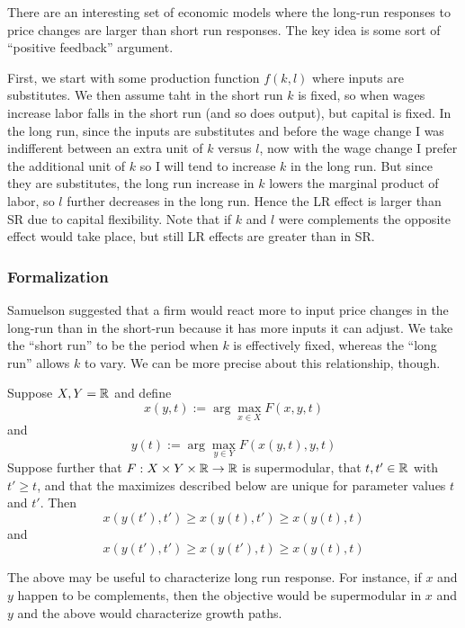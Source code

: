 There are an interesting set of economic models where the long-run
responses to price changes are larger than short run responses. The
key idea is some sort of ``positive feedback'' argument.

First, we start with some production function $f(k, l)$ where inputs
are substitutes. We then assume taht in the short run $k$ is fixed, so
when wages increase labor falls in the short run (and so does output),
but capital is fixed. In the long run, since the inputs are
substitutes and before the wage change I was indifferent between an
extra unit of $k$ versus $l$, now with the wage change I prefer the
additional unit of $k$ so I will tend to increase $k$ in the long
run. But since they are substitutes, the long run increase in $k$
lowers the marginal product of labor, so $l$ further decreases in the
long run. Hence the LR effect is larger than SR due to capital
flexibility. Note that if $k$ and $l$ were complements the opposite
effect would take place, but still LR effects are greater than in SR.


\subsubsection{Formalization}



Samuelson suggested that a firm would react more to input price
changes in the long-run than in the short-run because it has more
inputs it can adjust. We take the ``short run'' to be the period when
$k$ is effectively fixed, whereas the ``long run'' allows $k$ to
vary. We can be more precise about this relationship, though.

\begin{prop}
  Suppose $X, Y = {\mathbb R}$ and define
  \[
  x(y, t) := \arg \max_{x \in X} F(x,y,t)
  \]
  and
  \[
  y(t) := \arg \max_{y \in Y} F(x(y, t), y, t)
  \]
  Suppose further that $F: X \times Y \times {\mathbb R} \to {\mathbb R}$ is
  supermodular, that $t, t' \in {\mathbb R} $ with $t' \geq t$, and that the
  maximizes described below are unique for parameter values $t$ and
  $t'$. Then
  \[
  x(y(t'), t') \geq x(y(t), t') \geq x(y(t), t)
  \]
  and
  \[
  x(y(t'), t') \geq x(y(t'), t) \geq x(y(t), t)
  \]
\end{prop}

The above may be useful to characterize long run response. For
instance, if $x$ and $y$ happen to be complements, then the objective
would be supermodular in $x$ and $y$ and the above would characterize
growth paths.

